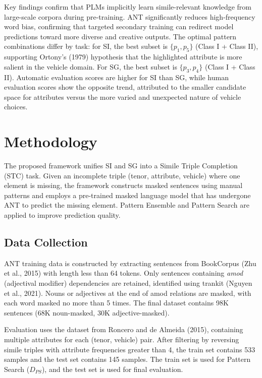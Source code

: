 \documentclass[12pt]{article}
\begin{document}
Key findings confirm that PLMs implicitly learn simile-relevant knowledge from large-scale corpora during pre-training. ANT significantly reduces high-frequency word bias, confirming that targeted secondary training can redirect model predictions toward more diverse and creative outputs. The optimal pattern combinations differ by task: for SI, the best subset is $\{p_1, p_5\}$ (Class I + Class II), supporting Ortony's (1979) hypothesis that the highlighted attribute is more salient in the vehicle domain. For SG, the best subset is $\{p_3, p_4\}$ (Class I + Class II). Automatic evaluation scores are higher for SI than SG, while human evaluation scores show the opposite trend, attributed to the smaller candidate space for attributes versus the more varied and unexpected nature of vehicle choices.

\section{Methodology}

The proposed framework unifies SI and SG into a Simile Triple Completion (STC) task. Given an incomplete triple (tenor, attribute, vehicle) where one element is missing, the framework constructs masked sentences using manual patterns and employs a pre-trained masked language model that has undergone ANT to predict the missing element. Pattern Ensemble and Pattern Search are applied to improve prediction quality.

\subsection{Data Collection}

ANT training data is constructed by extracting sentences from BookCorpus (Zhu et al., 2015) with length less than 64 tokens. Only sentences containing \textit{amod} (adjectival modifier) dependencies are retained, identified using trankit (Nguyen et al., 2021). Nouns or adjectives at the end of amod relations are masked, with each word masked no more than 5 times. The final dataset contains 98K sentences (68K noun-masked, 30K adjective-masked).

Evaluation uses the dataset from Roncero and de Almeida (2015), containing multiple attributes for each (tenor, vehicle) pair. After filtering by reversing simile triples with attribute frequencies greater than 4, the train set contains 533 samples and the test set contains 145 samples. The train set is used for Pattern Search ($D_{PS}$), and the test set is used for final evaluation.
\end{document}
